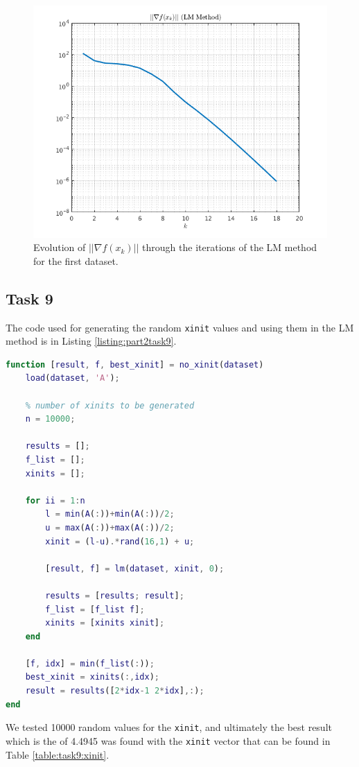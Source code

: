 \begin{figure}[H]
    \centering    
    \includegraphics[width=0.6\linewidth]{part2/figures/task8_norm.png}
    \caption{Evolution of $||\nabla f(x_k) ||$ through the iterations of the LM method for the first dataset.}
    \label{fig:task8:norm}
\end{figure}

\subsection{Task 9}

The code used for generating the random \texttt{xinit} values and using them in the LM method is in Listing \ref{listing:part2task9}.

\begin{lstlisting}[language=Matlab, caption=Matlab code for task 9., label=listing:part2task9]
function [result, f, best_xinit] = no_xinit(dataset)
    load(dataset, 'A');
    
    % number of xinits to be generated
    n = 10000;

    results = [];
    f_list = [];
    xinits = [];
    
    for ii = 1:n
        l = min(A(:))+min(A(:))/2;
        u = max(A(:))+max(A(:))/2;
        xinit = (l-u).*rand(16,1) + u;

        [result, f] = lm(dataset, xinit, 0);
        
        results = [results; result];
        f_list = [f_list f];
        xinits = [xinits xinit];
    end
    
    [f, idx] = min(f_list(:));
    best_xinit = xinits(:,idx);
    result = results([2*idx-1 2*idx],:);
end
\end{lstlisting}

We tested 10000 random values for the \texttt{xinit}, and ultimately the best result which is the  of 4.4945 was found with the \texttt{xinit} vector that can be found in Table \ref{table:task9:xinit}. 

